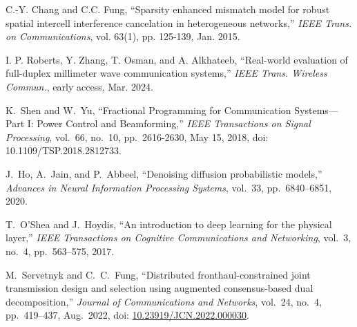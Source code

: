 \documentclass[10pt]{article}
\begin{document}
\begin{thebibliography}{99}

C.-Y. Chang and C.C. Fung, ``Sparsity enhanced mismatch model for robust spatial intercell interference cancelation in heterogeneous networks,'' \emph{IEEE Trans. on Communications}, vol. 63(1), pp. 125-139, Jan. 2015.

I. P. Roberts, Y. Zhang, T. Osman, and A. Alkhateeb, ``Real-world evaluation of full-duplex millimeter wave communication systems,'' \emph{IEEE Trans. Wireless Commun.}, early access, Mar. 2024.

K.~Shen and W.~Yu, ``Fractional Programming for Communication Systems—Part I: Power Control and Beamforming,'' \textit{IEEE Transactions on Signal Processing}, vol.~66, no.~10, pp.~2616-2630, May 15, 2018, doi: 10.1109/TSP.2018.2812733.

J.~Ho, A.~Jain, and P.~Abbeel, ``Denoising diffusion probabilistic models,'' 
\emph{Advances in Neural Information Processing Systems}, vol.~33, pp.~6840--6851, 2020.

T.~O’Shea and J.~Hoydis, ``An introduction to deep learning for the physical layer,'' 
\emph{IEEE Transactions on Cognitive Communications and Networking}, vol.~3, no.~4, pp.~563--575, 2017.

M.~Servetnyk and C.~C.~Fung, ``Distributed fronthaul-constrained joint transmission design and selection using augmented consensus-based dual decomposition,'' \textit{Journal of Communications and Networks}, vol.~24, no.~4, pp.~419--437, Aug.~2022, doi: \href{https://doi.org/10.23919/JCN.2022.000030}{10.23919/JCN.2022.000030}.

\end{thebibliography}
\end{document}
